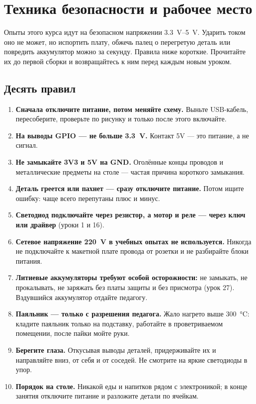 \section*{Техника безопасности и рабочее место}

Опыты этого курса идут на безопасном напряжении \SIrange{3.3}{5}{V}. Ударить током оно не может, но
испортить плату, обжечь палец о перегретую деталь или повредить аккумулятор можно за секунду.
Правила ниже короткие. Прочитайте их до первой сборки и возвращайтесь к ним перед каждым новым уроком.

\subsection*{Десять правил}

\begin{enumerate}
  \item \textbf{Сначала отключите питание, потом меняйте схему.} Выньте USB-кабель, пересоберите,
        проверьте по рисунку и только после этого включайте.
  \item \textbf{На выводы GPIO --- не больше \SI{3.3}{V}.} Контакт 5V --- это питание, а не сигнал.
  \item \textbf{Не замыкайте 3V3 и 5V на GND.} Оголённые концы проводов и металлические предметы на столе ---
        частая причина короткого замыкания.
  \item \textbf{Деталь греется или пахнет --- сразу отключите питание.} Потом ищите ошибку: чаще
        всего перепутаны плюс и минус.
  \item \textbf{Светодиод подключайте через резистор, а мотор и реле --- через ключ или драйвер}
        (уроки 1 и 16).
  \item \textbf{Сетевое напряжение \SI{220}{V} в учебных опытах не используется.} Никогда не подключайте
        к макетной плате провода от розетки и не разбирайте блоки питания.
  \item \textbf{Литиевые аккумуляторы требуют особой осторожности:} не замыкать, не прокалывать, не
        заряжать без платы защиты и без присмотра (урок 27). Вздувшийся аккумулятор отдайте педагогу.
  \item \textbf{Паяльник --- только с разрешения педагога.} Жало нагрето выше \SI{300}{\celsius}: кладите
        паяльник только на подставку, работайте в проветриваемом помещении, после пайки мойте руки.
  \item \textbf{Берегите глаза.} Откусывая выводы деталей, придерживайте их и направляйте вниз, от себя
        и от соседей. Не смотрите на яркие светодиоды в упор.
  \item \textbf{Порядок на столе.} Никакой еды и напитков рядом с электроникой; в конце занятия отключите
        питание и разложите детали по ячейкам.
\end{enumerate}

